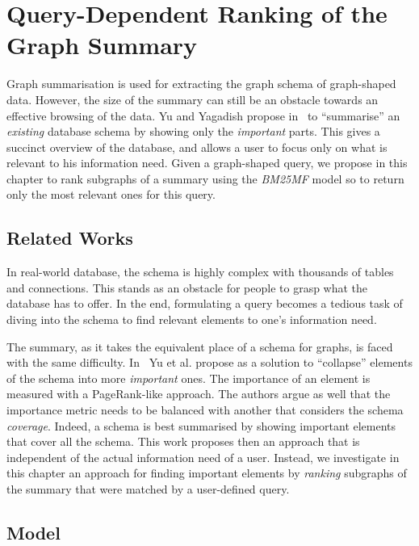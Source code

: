 \chapter{Query-Dependent Ranking of the Graph Summary}
\label{chap:summary-ranking}

Graph summarisation is used for extracting the graph schema of graph-shaped data. However, the size of the summary can still be an obstacle towards an effective browsing of the data. Yu and Yagadish propose in~\cite{yu:2006:schema-summarization} to ``summarise'' an \emph{existing} database schema by showing only the \emph{important} parts. This gives a succinct overview of the database, and allows a user to focus only on what is relevant to his information need. Given a graph-shaped query, we propose in this chapter to rank subgraphs of a summary using the \emph{BM25MF} model so to return only the most relevant ones for this query.

\section{Related Works}
\label{chap:summary-ranking:relworks}

In real-world database, the schema is highly complex with thousands of tables and connections. This stands as an obstacle for people to grasp what the database has to offer. In the end, formulating a query becomes a tedious task of diving into the schema to find relevant elements to one's information need.

The summary, as it takes the equivalent place of a schema for graphs, is faced with the same difficulty. In~\cite{yu:2006:schema-summarization} Yu et al. propose as a solution to ``collapse'' elements of the schema into more \emph{important} ones. The importance of an element is measured with a PageRank-like approach. The authors argue as well that the importance metric needs to be balanced with another that considers the schema \emph{coverage}. Indeed, a schema is best summarised by showing important elements that cover all the schema. This work proposes then an approach that is independent of the actual information need of a user. Instead, we investigate in this chapter an approach for finding important elements by \emph{ranking} subgraphs of the summary that were matched by a user-defined query.

\section{Model}
\label{chap:summary-ranking:model}

